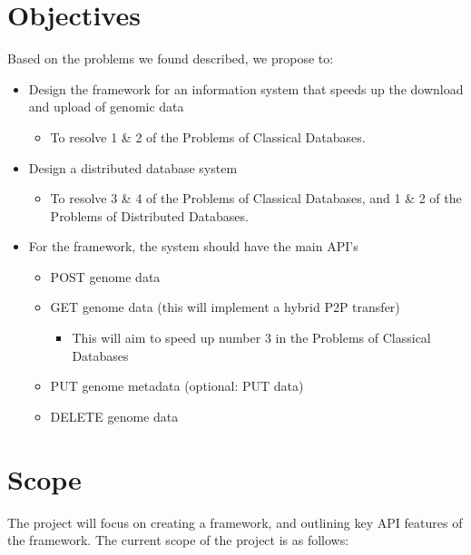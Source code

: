\documentclass[acmsmall]{acmart}
\begin{document}
\section{Objectives}

Based on the problems we found described, we propose to:

\begin{itemize}
    \item Design the framework for an information system that speeds up the download and upload of genomic data
    \begin{itemize} 
        \item To resolve 1 \& 2 of the Problems of Classical Databases. 
    \end{itemize}
    \item  Design a distributed database system
    \begin{itemize}
        \item To resolve 3 \& 4 of the Problems of Classical Databases, and 1 \& 2 of the Problems of Distributed Databases. 
    \end{itemize}
\end{itemize}

\begin{itemize}
    \item For the framework, the system should have the main API’s 
    \begin{itemize}
        \item POST genome data
        \item GET genome data (this will implement a hybrid P2P transfer)
        \begin{itemize}
            \item This will aim to speed up number 3 in the Problems of Classical Databases
        \end{itemize}
        \item PUT genome metadata (optional: PUT data)
        \item DELETE genome data
    \end{itemize}
\end{itemize}


\section{Scope}

The project will focus on creating a framework, and outlining key API features of the framework. The current scope of the project is as follows:
\end{document}
